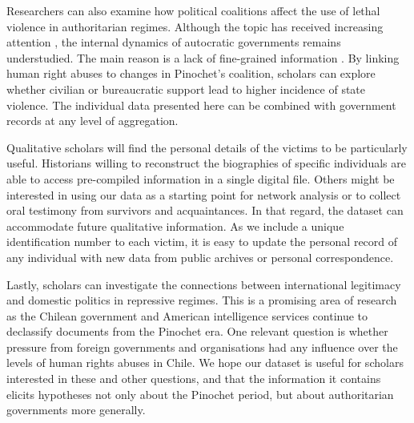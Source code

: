 \documentclass[12pt,a4paper,]{article}
\begin{document}
Researchers can also examine how political coalitions affect the use of
lethal violence in authoritarian regimes. Although the topic has
received increasing attention
\citep[e.g.,][]{fjelde2010generals, gandhi2007authoritarian, rivera2017authoritarian},
the internal dynamics of autocratic governments remains understudied.
The main reason is a lack of fine-grained information
\citep[16]{ferrara2014assessing}. By linking human right abuses to
changes in Pinochet's coalition, scholars can explore whether civilian
or bureaucratic support lead to higher incidence of state violence. The
individual data presented here can be combined with government records
at any level of aggregation.

Qualitative scholars will find the personal details of the victims to be
particularly useful. Historians willing to reconstruct the biographies
of specific individuals are able to access pre-compiled information in a
single digital file. Others might be interested in using our data as a
starting point for network analysis or to collect oral testimony from
survivors and acquaintances. In that regard, the dataset can accommodate
future qualitative information. As we include a unique identification
number to each victim, it is easy to update the personal record of any
individual with new data from public archives or personal
correspondence.

Lastly, scholars can investigate the connections between international
legitimacy and domestic politics in repressive regimes. This is a
promising area of research as the Chilean government and American
intelligence services continue to declassify documents from the Pinochet
era. One relevant question is whether pressure from foreign governments
and organisations had any influence over the levels of human rights
abuses in Chile. We hope our dataset is useful for scholars interested
in these and other questions, and that the information it contains
elicits hypotheses not only about the Pinochet period, but about
authoritarian governments more generally.

\newpage
\setlength{\parindent}{0cm}
\setlength{\parskip}{6pt}


\end{document}
